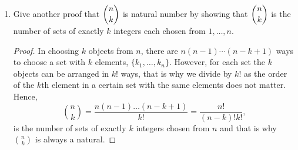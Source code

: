 \begin{exercise}[\textbf{3}]
\begin{enumerate}
\begin{proof}
\begin{equation*}
                \binom{n}{k} \text{is a natural number for all }k, 1\leq k \leq n.
            \end{equation*}
            We prove it by induction on $n$. For the base case where $n=1$, we
            only need to prove for $k=1$.
            \begin{equation*}
                \binom{1}{1} =1.
            \end{equation*}
            For the inductive step, we assume that the assertion is true for
            arbitrary $n$ and we will show that 
            \begin{equation*}
                \binom{n+1}{k} \text{ is a natural number for all }k, 1\leq k\leq n+1.
            \end{equation*}
            The case where $k=1$ and $k=n+1$ are trivial. We can now assume that
            for $2\leq k\leq n$, it must be that  $1\leq k-1< k\leq n$ and we
            can make use this with part (i)
            \begin{equation*}
                \binom{n+1}{k} = \binom{n}{k-1}+\binom{n}{k}, 
            \end{equation*}
            since the sum of naturals is a natural, $\binom{n+1}{k}$ is
            natural. We have shown that $\binom{n+1}{k}$ is natural for
            all $k$, $1\leq k \leq n+1$ if $\binom{n}{k}$ is natural for all k
            $1\leq k \leq n$. Hence, the induction is complete.
         \end{proof}
         \item Give another proof that $\dbinom{n}{k}$ is natural number by
         showing that $\dbinom{n}{k}$ is the number of sets of exactly $k$
         integers each chosen from $1,\dotsc , n$.
         \begin{proof} In choosing $k$ objects from $n$, there are $n(n-1)\dotsb
         (n-k+1)$ ways to choose a set with $k$ elements, $\{k_1,\dotsc, k_n
         \}$. However, for each set the $k$ objects can be arranged in $k!$
         ways, that is why we divide by $k!$ as the order of the $k$th element
         in a certain set with the same elements does not matter. Hence, 
         \begin{equation*}
             \binom{n}{k} = \frac{n(n-1)\dotsc (n-k+1)}{k!} = \frac{n!}{(n-k)!k!},
         \end{equation*}
              is the number of sets of exactly $k$ integers chosen from $n$ and
              that is why $\binom{n}{k}$ is always a natural.
         \end{proof}

\end{enumerate}
\end{exercise}
